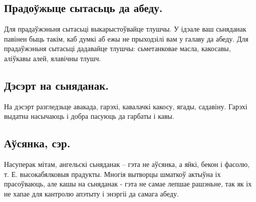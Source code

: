 \subsection{Прадоўжыце сытасьць да абеду.}
Для прадаўжэньня сытасьці выкарыстоўвайце тлушчы. У ідэале ваш сьняданак павінен быць такім, каб думкі аб ежы не прыходзілі вам у галаву да абеду. Для прадаўжэньня сытасьці дадавайце тлушчы: сьметанковае масла, какосавы, аліўкавы алей, ялавічны тлушч.

\subsection{Дэсэрт на сьняданак.}
На дэсэрт разгледзьце авакада, гарэхі, кавалачкі какосу, ягады, садавіну. Гарэхі выдатна насычаюць і добра пасуюць да гарбаты і кавы.

\subsection{Аўсянка, сэр.}
Насуперак мітам, ангельскі сьняданак – гэта не аўсянка, а яйкі, бекон і фасолю, т. Е. высокабялковыя прадукты. Многія вытворцы шматкоў актыўна іх прасоўваюць, але кашы на сьняданак - гэта не самае лепшае рашэньне, так як іх не хапае для кантролю апэтыту і энэргіі да самага абеду.
